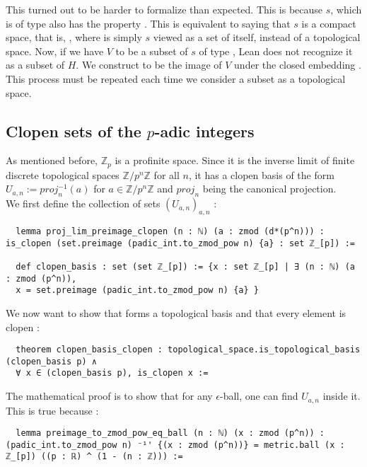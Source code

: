 \documentclass[11pt]{article}
\begin{document}
This turned out to be harder to formalize than expected. This is because $s$, which is of type
 also has the property . This is equivalent to saying
that $s$ is a compact space, that is, , where
 is simply $s$ viewed as a set of itself, instead of a topological space.
Now, if we have $V$ to be a subset of $s$ of type , Lean does not recognize it as
a subset of $H$. We construct  to be the image of $V$ under the closed embedding . This process must be repeated each time we consider a
subset as a topological space.

\subsection{Clopen sets of the $p$-adic integers}
As mentioned before, $\mathbb{Z}_p$ is a profinite space. Since it is the inverse limit of finite
discrete topological spaces $\mathbb{Z}/p^n \mathbb{Z}$ for all $n$, it has a clopen basis of the
form $U_{a,n} := proj_n ^{-1} (a)$ for $a \in \mathbb{Z}/p^n \mathbb{Z}$ and $proj_n$ being the
canonical projection. \\

We first define the collection of sets $(U_{a,n})_{a,n}$ :
\begin{lstlisting}
  lemma proj_lim_preimage_clopen (n : ℕ) (a : zmod (d*(p^n))) : is_clopen (set.preimage (padic_int.to_zmod_pow n) {a} : set ℤ_[p]) :=

  def clopen_basis : set (set ℤ_[p]) := {x : set ℤ_[p] | ∃ (n : ℕ) (a : zmod (p^n)),
  x = set.preimage (padic_int.to_zmod_pow n) {a} }
\end{lstlisting}

We now want to show that  forms a topological basis and that every element is
clopen :
\begin{lstlisting}
  theorem clopen_basis_clopen : topological_space.is_topological_basis (clopen_basis p) ∧
  ∀ x ∈ (clopen_basis p), is_clopen x :=
\end{lstlisting}
The mathematical proof is to show that for any $\epsilon$-ball, one can find $U_{a,n}$ inside it.
This is true because :
\begin{lstlisting}
  lemma preimage_to_zmod_pow_eq_ball (n : ℕ) (x : zmod (p^n)) : (padic_int.to_zmod_pow n) ⁻¹' {(x : zmod (p^n))} = metric.ball (x : ℤ_[p]) ((p : ℝ) ^ (1 - (n : ℤ))) :=
\end{lstlisting}
\end{document}
